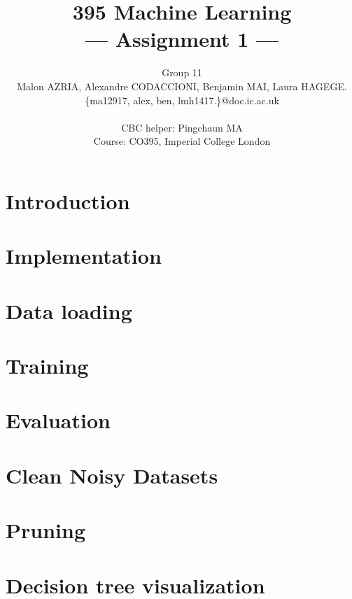 \documentclass[a4paper,11pt]{article}
\title{395 Machine Learning\\\Large{--- Assignment 1 ---}}
\author{Group 11\\Malon AZRIA, Alexandre CODACCIONI, Benjamin MAI, Laura HAGEGE.\\
       \{ma12917, alex, ben, lmh1417.\}@doc.ic.ac.uk\\ \\
       \small{CBC helper: Pingchaun MA}\\
       \small{Course: CO395, Imperial College London}
}
\begin{document}
\maketitle

\section{Introduction}
    


\section{Implementation}
    
 

\section{Data loading}
    

\section{Training}
    
    
\section{Evaluation}
    
	
\section{Clean Noisy Datasets}
	

\section{Pruning}
    


\newpage
\section{Decision tree visualization}
    
\end{document}
